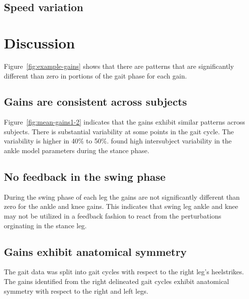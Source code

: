 \documentclass{article}
\begin{document}
\subsection{Speed variation}
%
\section*{Discussion}
%
Figure~\ref{fig:example-gains} shows that there are patterns that are
significantly different than zero in portions of the gait phase for each gain.


\subsection*{Gains are consistent across subjects}
%
Figure~\ref{fig:mean-gains1-2} indicates that the gains exhibit similar
patterns across subjects. There is substantial variability at some points in
the gait cycle. The variability is higher in 40\% to 50\%. \cite{Rouse2014}
found high intersubject variability in the ankle model parameters during the
stance phase.


\subsection*{No feedback in the swing phase}
%
During the swing phase of each leg the gains are not significantly different
than zero for the ankle and knee gains. This indicates that swing leg ankle and
knee may not be utilized in a feedback fashion to react from the perturbations
orginating in the stance leg.


\subsection*{Gains exhibit anatomical symmetry}
%
The gait data was split into gait cycles with respect to the right leg's
heelstrikes. The gains identified from the right delineated gait cycles exhibit
anatomical symmetry with respect to the right and left legs.
\end{document}
